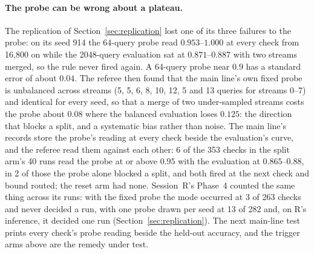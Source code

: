 \documentclass[11pt]{article}
\begin{document}
\paragraph{The probe can be wrong about a plateau.} The replication of Section~\ref{sec:replication} lost one of its three failures to the probe: on its seed 914 the 64-query probe read $0.953$--$1.000$ at every check from 16{,}800 on while the 2048-query evaluation sat at $0.871$--$0.887$ with two streams merged, so the rule never fired again. A 64-query probe near $0.9$ has a standard error of about $0.04$. The referee then found that the main line's own fixed probe is unbalanced across streams (5, 5, 6, 8, 10, 12, 5 and 13 queries for streams 0--7) and identical for every seed, so that a merge of two under-sampled streams costs the probe about $0.08$ where the balanced evaluation loses $0.125$: the direction that blocks a split, and a systematic bias rather than noise. The main line's records store the probe's reading at every check beside the evaluation's curve, and the referee read them against each other: 6 of the 353 checks in the split arm's 40 runs read the probe at or above $0.95$ with the evaluation at $0.865$--$0.88$, in 2 of those the probe alone blocked a split, and both fired at the next check and bound routed; the reset arm had none. Session~R's Phase~4 counted the same thing across its runs: with the fixed probe the mode occurred at 3 of 263 checks and never decided a run, with one probe drawn per seed at 13 of 282 and, on R's inference, it decided one run (Section~\ref{sec:replication}). The next main-line test prints every check's probe reading beside the held-out accuracy, and the trigger arms above are the remedy under test.
\end{document}
